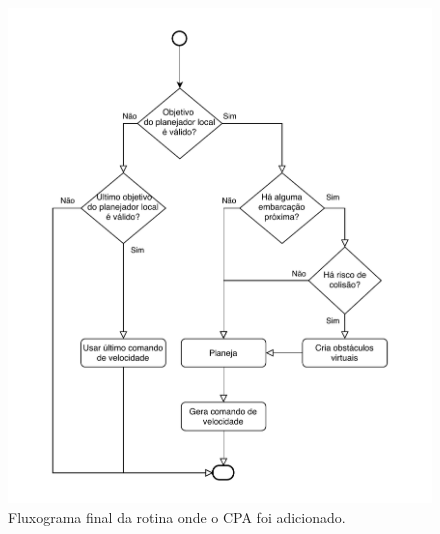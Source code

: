     \begin{figure}
        \centering
        \includegraphics{fig/chap4/find_best_path_diagram_cpa.pdf}
        \caption{Fluxograma final da rotina onde o CPA foi adicionado.}
        \label{fig:chap4_fluxograma_final}
    \end{figure}
    
    
